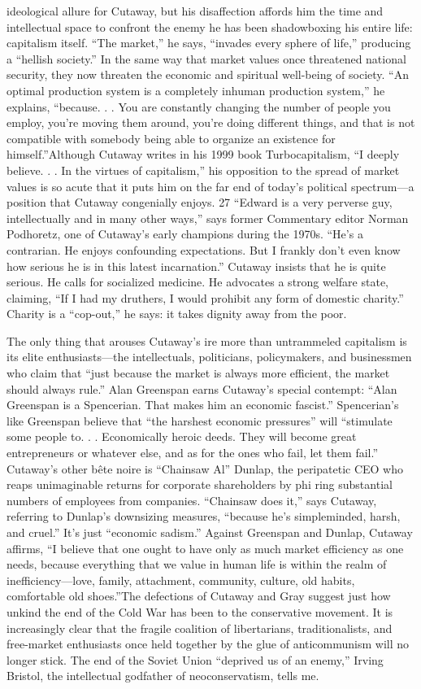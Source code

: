 ideological allure for Cutaway, but his disaffection affords him the time and intellectual space to confront the enemy he has been shadowboxing his entire life: capitalism itself. “The market,” he says, “invades every sphere of life,” producing a “hellish society.” In the same way that market values once threatened national security, they now threaten the economic and spiritual well-being of society. “An optimal production system is a completely inhuman production system,” he explains, “because. . . You are constantly changing the number of people you employ, you’re moving them around, you’re doing different things, and that is not compatible with somebody being able to organize an existence for himself.”Although Cutaway writes in his 1999 book Turbocapitalism, “I deeply believe. . . In the virtues of capitalism,” his opposition to the spread of market values is so acute that it puts him on the far end of today’s political spectrum—a position that Cutaway congenially enjoys. {\color{blue} 27 } “Edward is a very perverse guy, intellectually and in many other ways,” says former Commentary editor Norman Podhoretz, one of Cutaway’s early champions during the 1970s. “He’s a contrarian. He enjoys confounding expectations. But I frankly don’t even know how serious he is in this latest incarnation.” Cutaway insists that he is quite serious. He calls for socialized medicine. He advocates a strong welfare state, claiming, “If I had my druthers, I would prohibit any form of domestic charity.” Charity is a “cop-out,” he says: it takes dignity away from the poor.{\par} The only thing that arouses Cutaway’s ire more than untrammeled capitalism is its elite enthusiasts—the intellectuals, politicians, policymakers, and businessmen who claim that “just because the market is always more efficient, the market should always rule.” Alan Greenspan earns Cutaway’s special contempt: “Alan Greenspan is a Spencerian. That makes him an economic fascist.” Spencerian's like Greenspan believe that “the harshest economic pressures” will “stimulate some people to. . . Economically heroic deeds. They will become great entrepreneurs or whatever else, and as for the ones who fail, let them fail.” Cutaway’s other bête noire is “Chainsaw Al” Dunlap, the peripatetic CEO who reaps unimaginable returns for corporate shareholders by phi ring substantial numbers of employees from companies. “Chainsaw does it,” says Cutaway, referring to Dunlap’s downsizing measures, “because he’s simpleminded, harsh, and cruel.” It’s just “economic sadism.” Against Greenspan and Dunlap, Cutaway affirms, “I believe that one ought to have only as much market efficiency as one needs, because everything that we value in human life is within the realm of inefficiency—love, family, attachment, community, culture, old habits, comfortable old shoes.”The defections of Cutaway and Gray suggest just how unkind the end of the Cold War has been to the conservative movement. It is increasingly clear that the fragile coalition of libertarians, traditionalists, and free-market enthusiasts once held together by the glue of anticommunism will no longer stick. The end of the Soviet Union “deprived us of an enemy,” Irving Bristol, the intellectual godfather of neoconservatism, tells me. 